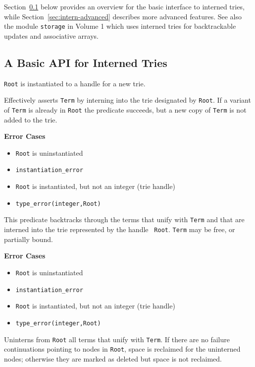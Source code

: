 Section~\ref{sec:intern-basic} below provides an overview for the
basic interface to interned tries, while
Section~\ref{sec:intern-advanced} describes more advanced features.
See also the module {\tt storage} in Volume 1 which uses interned
tries for backtrackable updates and associative arrays.


\subsection{A Basic API for Interned Tries} \label{sec:intern-basic}
\begin{description}
 
        {\tt Root} is instantiated to a handle for a new trie.

% 
Effectively asserts \texttt{Term} by interning into the trie
designated by {\tt Root}.  If a variant of {\tt Term} is already in
{\tt Root} the predicate succeeds, but a new copy of {\tt Term} is not
added to the trie.

{\bf Error Cases}
\begin{itemize}
\item 	{\tt Root} is uninstantiated
\bi
\item 	 {\tt instantiation\_error}
\ei
\item 	{\tt Root} is instantiated, but not an integer (trie handle)
\bi
\item 	 {\tt type\_error(integer,Root)}
\ei
\end{itemize}

This predicate backtracks through the terms that unify with {\tt Term}
and that are interned into the trie represented by the handle {\tt
  Root}.  {\tt Term} may be free, or partially bound.

{\bf Error Cases}
\begin{itemize}
\item 	{\tt Root} is uninstantiated
\bi
\item 	 {\tt instantiation\_error}
\ei
\item 	{\tt Root} is instantiated, but not an integer (trie handle)
\bi
\item 	 {\tt type\_error(integer,Root)}
\ei
\end{itemize}

% 
Uninterns from {\tt Root} all terms that unify with {\tt Term}.  If
there are no failure continuations pointing to nodes in {\tt Root},
space is reclaimed for the uninterned nodes; otherwise they are marked
as deleted but space is not reclaimed.


\end{description}
